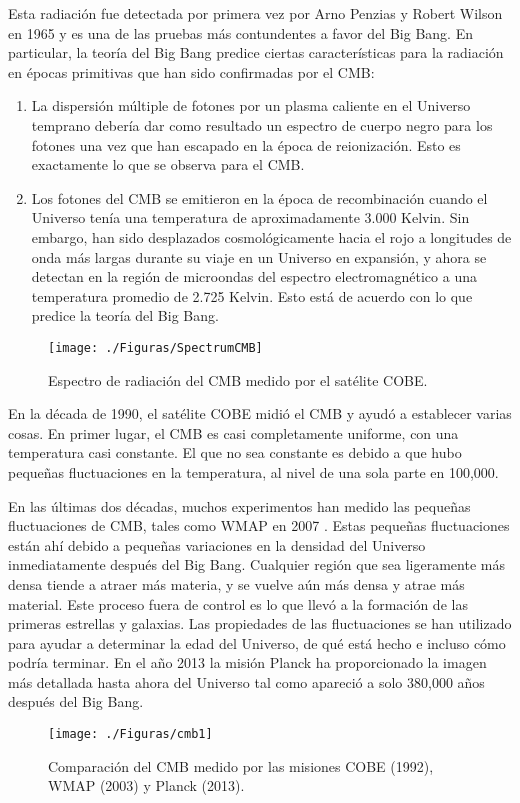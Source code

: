 \documentclass[a4paper,openright,12pt]{book}
\begin{document}
Esta radiación fue detectada por primera vez por Arno Penzias y Robert Wilson en 1965 y es una de las pruebas más contundentes a favor del Big Bang. En particular, la teoría del Big Bang predice ciertas características para la radiación en épocas primitivas que han sido confirmadas por el CMB:

\begin{enumerate}
\item La dispersión múltiple de fotones por un plasma caliente en el Universo temprano debería dar como resultado un espectro de cuerpo negro para los fotones una vez que han escapado en la época de reionización. Esto es exactamente lo que se observa para el CMB.
\item Los fotones del CMB se emitieron en la época de recombinación cuando el Universo tenía una temperatura de aproximadamente 3.000 Kelvin. Sin embargo, han sido desplazados cosmológicamente hacia el rojo a longitudes de onda más largas durante su viaje en un Universo en expansión, y ahora se detectan en la región de microondas del espectro electromagnético a una temperatura promedio de 2.725 Kelvin. Esto está de acuerdo con lo que predice la teoría del Big Bang. 
\end{enumerate}
\begin{figure}
\centering
  \texttt{[image: ./Figuras/SpectrumCMB]}
  \caption{\footnotesize{Espectro de radiación del CMB medido por el satélite COBE.}}
  \label{fig 1.3}
\end{figure}
En la década de 1990, el satélite COBE midió el CMB  y ayudó a establecer varias cosas. En primer lugar, el CMB es casi completamente uniforme, con una temperatura casi constante. El que no sea constante es debido a que hubo pequeñas fluctuaciones en la temperatura, al nivel de una sola parte en 100,000. 

En las últimas dos décadas, muchos experimentos han medido las pequeñas fluctuaciones de CMB, tales como WMAP en 2007 \cite{1.1.3} . Estas pequeñas fluctuaciones están ahí debido a pequeñas variaciones en la densidad del Universo inmediatamente después del Big Bang. Cualquier región que sea ligeramente más densa tiende a atraer más materia, y se vuelve aún más densa y atrae más material. Este proceso fuera de control es lo que llevó a la formación de las primeras estrellas y galaxias. Las propiedades de las fluctuaciones se han utilizado para ayudar a determinar la edad del Universo, de qué está hecho e incluso cómo podría terminar. En el año 2013 la misión Planck \cite{1.1.4} ha proporcionado la imagen más detallada hasta ahora del Universo tal como apareció a solo 380,000 años después del Big Bang.
\begin{figure}
\centering
  \texttt{[image: ./Figuras/cmb1]}
  \caption{\footnotesize{Comparación del CMB medido por las misiones COBE (1992), WMAP (2003) y Planck (2013).}}
  \label{fig 1.4}
\end{figure}
\end{document}
